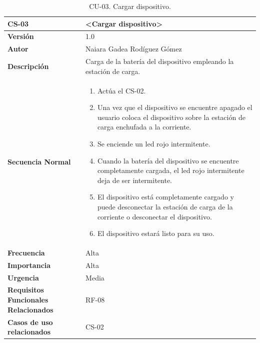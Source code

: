 \begin{table}[h!]%
\centering
\begin{tabular}{ |m{3cm}|m{11cm}|  } 
\hline
\cellcolor[HTML]{B9E3F0}\textbf{CS-03} & \cellcolor[HTML]{B9E3F0}\textbf{<Cargar dispositivo>}\\

\hline
\cellcolor[HTML]{EFEFEF}\textbf{Versión}             & 1.0  \\
\hline
\cellcolor[HTML]{EFEFEF}\textbf{Autor}                & Naiara Gadea Rodíguez Gómez\\
\hline
\cellcolor[HTML]{EFEFEF}\textbf{Descripción}                & {Carga de la batería del dispositivo empleando la estación de carga.}\\
\hline
\cellcolor[HTML]{EFEFEF}\textbf{Secuencia \newline Normal}                &                 
        \begin{enumerate}
			\def\labelenumi{\arabic{enumi}.}
			\tightlist
			\item Actúa el CS-02. 
			\item Una vez que el dispositivo se encuentre apagado el usuario coloca el dispositivo sobre la estación de carga enchufada a la corriente.
                \item Se enciende un led rojo intermitente.
                \item Cuando la batería del dispositivo se encuentre completamente cargada, el led rojo intermitente deja de ser intermitente.
                \item El dispositivo está completamente cargado y puede desconectar la estación de carga de la corriente o desconectar el dispositivo.
                \item El dispositivo estará listo para su uso.
		\end{enumerate}\\
\hline
\cellcolor[HTML]{EFEFEF}\textbf{Frecuencia}                & Alta\\
\hline
\cellcolor[HTML]{EFEFEF}\textbf{Importancia}                & Alta\\
\hline
\cellcolor[HTML]{EFEFEF}\textbf{Urgencia}                & Media\\
\hline
\cellcolor[HTML]{EFEFEF}\textbf{Requisitos Funcionales Relacionados}                & {RF-08}\\
\hline
\cellcolor[HTML]{EFEFEF}\textbf{Casos de uso relacionados}                & {CS-02}\\
\hline
\end{tabular}
\caption{CU-03. Cargar dispositivo.}
\end{table}

